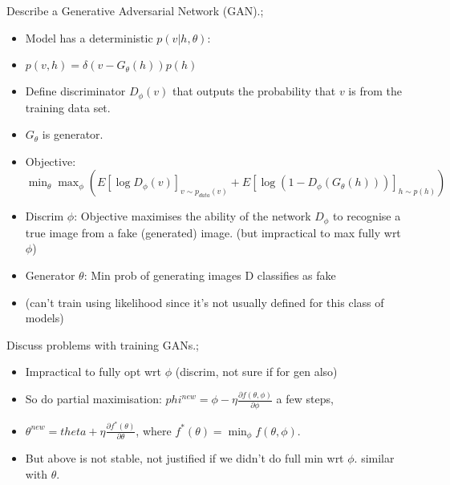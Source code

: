 \documentclass{article}
\begin{document}
Describe a Generative Adversarial Network (GAN).; \begin{itemize} \item Model has a deterministic $p(v|h, \theta)$: \item $p(v, h) = \delta(v-G_\theta(h))p(h)$ \item Define discriminator $D_\phi(v)$ that outputs the probability that $v$ is from the training data set. \item $G_\theta$ is generator. \item Objective: $\min_\theta \max_\phi (E[\log D_\phi(v)]_{v\sim p_{data}(v)} + E[\log(1-D_{\phi}(G_\theta(h)))]_{h\sim p(h)})$  \item Discrim $\phi$: Objective maximises the ability of the network $D_\phi$ to recognise a true image from a fake (generated) image. (but impractical to max fully wrt $\phi$) \item Generator $\theta$: Min prob of generating images D classifies as fake \item (can't train using likelihood since it's not usually defined for this class of models) \end{itemize}

Discuss problems with training GANs.; \begin{itemize} \item Impractical to fully opt wrt $\phi$ (discrim, not sure if for gen also) \item So do partial maximisation: $phi^{new} = \phi - \eta \frac{\partial f(\theta, \phi)}{\partial \phi}$ a few steps,  \item $\theta^{new} =  theta + \eta \frac{\partial f^*(\theta)}{\partial \theta}$, where $f^*(\theta) = \min_{\phi} f(\theta, \phi)$.  \item But above is not stable, not justified if we didn't do full min wrt $\phi$. similar with $\theta$. \end{itemize}
\end{document}
